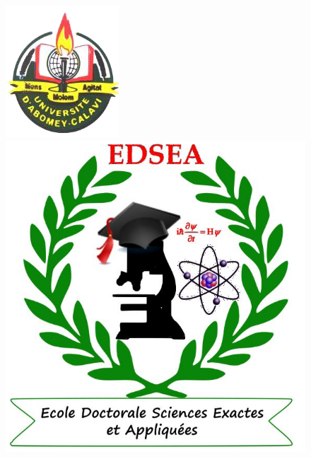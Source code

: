 \documentclass[a4paper,12pt]{report}
\title{
 }
\author{ 
}
\date{ 
}
\theoremstyle{plain}
\theoremstyle{plain}
\begin{document}
\begin{titlepage} 
	
	
		
	

 \begin{figure}\includegraphics[scale=0.5]
 {logoUAC1.png}
 \hspace*{10cm}
 \ \includegraphics[scale=0.2]{logosm.png}

\end{figure}
\end{titlepage}
\end{document}
